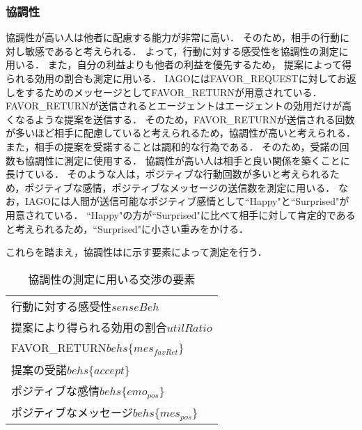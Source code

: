 \subsubsection{協調性}
協調性が高い人は他者に配慮する能力が非常に高い．
そのため，相手の行動に対し敏感であると考えられる．
よって，行動に対する感受性を協調性の測定に用いる．
また，自分の利益よりも他者の利益を優先するため，
提案によって得られる効用の割合も測定に用いる．
IAGOにはFAVOR\_REQUESTに対してお返しをするためのメッセージとしてFAVOR\_RETURNが用意されている．
FAVOR\_RETURNが送信されるとエージェントはエージェントの効用だけが高くなるような提案を送信する．
そのため，FAVOR\_RETURNが送信される回数が多いほど相手に配慮していると考えられるため，協調性が高いと考えられる．
また，相手の提案を受諾することは調和的な行為である．
そのため，受諾の回数も協調性に測定に使用する．
協調性が高い人は相手と良い関係を築くことに長けている．
そのような人は，ポジティブな行動回数が多いと考えられるため，ポジティブな感情，ポジティブなメッセージの送信数を測定に用いる．
なお，IAGOには人間が送信可能なポジティブ感情として“Happy"と“Surprised"が用意されている．
“Happy"の方が“Surprised"に比べて相手に対して肯定的であると考えられるため，“Surprised"に小さい重みをかける．

これらを踏まえ，協調性はに示す要素によって測定を行う．

\begin{table}[b]
    \centering
    \caption{協調性の測定に用いる交渉の要素}
    \begin{tabular}{l} \toprule
        行動に対する感受性$senseBeh$ \\
        提案により得られる効用の割合$utilRatio$  \\
        FAVOR\_RETURN$behs\{mes_{\mathit{favRet}}\}$ \\
        提案の受諾$behs\{accept\}$ \\ 
        ポジティブな感情$behs\{emo_{pos}\}$ \\
        ポジティブなメッセージ$behs\{mes_{pos}\}$ \\ \bottomrule
    \end{tabular}
    \label{tab:agreeableness}
\end{table}

